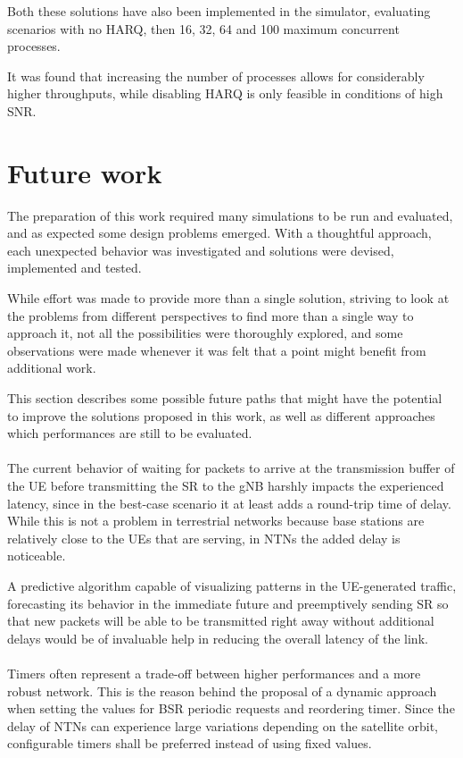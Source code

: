 Both these solutions have also been implemented in the simulator, evaluating scenarios with no \ac{HARQ}, then 16, 32, 64 and 100 maximum concurrent processes. 

It was found that increasing the number of processes allows for considerably higher throughputs, while disabling \ac{HARQ} is only feasible in conditions of high \ac{SNR}.

\section{Future work}

The preparation of this work required many simulations to be run and evaluated, and as expected some design problems emerged. With a thoughtful approach, each unexpected behavior was investigated and solutions were devised, implemented and tested.

While effort was made to provide more than a single solution, striving to look at the problems from different perspectives to find more than a single way to approach it, not all the possibilities were thoroughly explored, and some observations were made whenever it was felt that a point might benefit from additional work.

This section describes some possible future paths that might have the potential to improve the solutions proposed in this work, as well as different approaches which performances are still to be evaluated.

\paragraph{}
The current behavior of waiting for packets to arrive at the transmission buffer of the \ac{UE} before transmitting the \ac{SR} to the \ac{gNB} harshly impacts the experienced latency, since in the best-case scenario it at least adds a round-trip time of delay. While this is not a problem in terrestrial networks because base stations are relatively close to the \ac{UE}s that are serving, in \ac{NTN}s the added delay is noticeable. 

A predictive algorithm capable of visualizing patterns in the \ac{UE}-generated traffic, forecasting its behavior in the immediate future and preemptively sending \ac{SR} so that new packets will be able to be transmitted right away without additional delays would be of invaluable help in reducing the overall latency of the link.

\paragraph{}
Timers often represent a trade-off between higher performances and a more robust network. This is the reason behind the proposal of a dynamic approach when setting the values for \ac{BSR} periodic requests and reordering timer. Since the delay of \ac{NTN}s can experience large variations depending on the satellite orbit, configurable timers shall be preferred instead of using fixed values.

